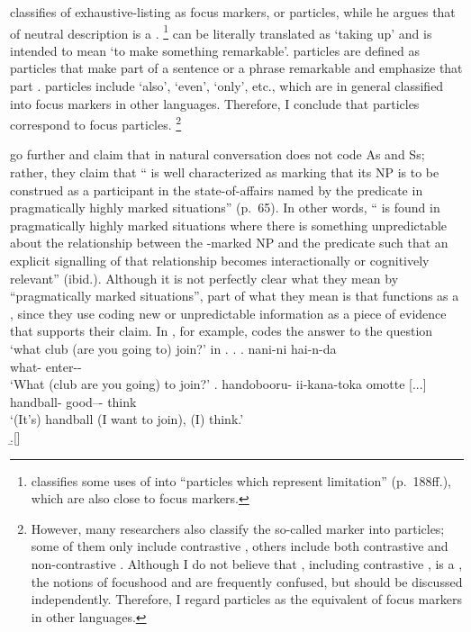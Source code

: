  classifies  of exhaustive-listing as focus markers, or  particles,
while he argues that  of neutral description is a .%
 \footnote{
  classifies some uses of  into ``particles which represent limitation'' (p.~188ff.),
 which are also close to focus markers.
 }
 can be literally translated as `taking up'
and is intended to mean `to make something remarkable'.
 particles are defined as
particles that make part of a sentence or a phrase remarkable and emphasize that part \cite[178]{miyata48}.
 particles include  `also',  `even',
 `only', etc.,
which are in general classified into focus markers in other languages.
Therefore, I conclude that  particles correspond to
focus particles.%
 \footnote{
 However, many researchers also classify the so-called  marker 
  into  particles;
 some of them only include contrastive   \cite{okutsu74,okutsu86,numata86},
 others include both contrastive and non-contrastive 
 \cite{miyata48,suzuki72,teramura81,noda95}.
 Although I do not believe that , including contrastive , is a ,
 the notions of focushood and  are frequently confused,
 but should be discussed independently.
 Therefore, I regard  particles as the equivalent of focus markers
 in other languages.}

 go further and claim that
 in natural conversation does not code As and Ss;
rather, they claim that
`` is well characterized as marking that its NP is to be construed as a participant in the state-of-affairs named by the predicate in pragmatically highly marked situations'' (p.~65).
In other words,
`` is found in pragmatically highly marked situations where
there is something unpredictable about the relationship between
the -marked NP and the predicate such that
an explicit signalling of that relationship becomes interactionally or cognitively relevant'' (ibid.).
Although it is not perfectly clear what they mean by
``pragmatically marked situations'',
part of what they mean is that
 functions as a , since they use  coding new or unpredictable information
as a piece of evidence that supports their claim.
In \Next[b], for example,
 codes the answer to the question
`what club (are you going to) join?' in \Next[a].
%
\ex.
 \ag. nani-ni hai-n-da \\
      what- enter-- \\
      `What (club are you going) to join?'
 \bg. handobooru- ii-kana-toka omotte [...] \\
      handball- good--- think \\
      `(It's) handball (I want to join), (I) think.' \\
 \b.[]     \hfill{\cite[70]{onoetal00}}


